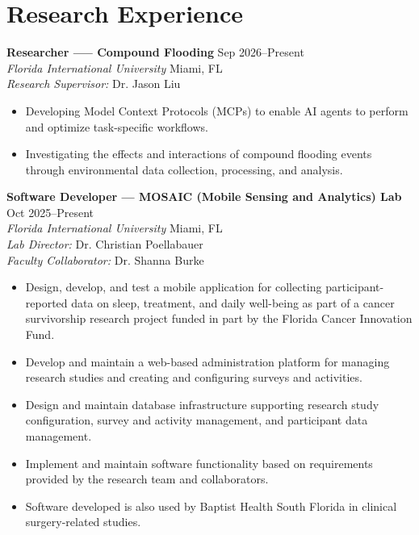 \documentclass[11pt]{article}
\begin{document}
\section{Research Experience}

\noindent
    \textbf{Researcher —-- Compound Flooding} \hfill Sep 2026--Present\\
    \textit{Florida International University} \hfill Miami, FL\\
    \textit{Research Supervisor:} Dr. Jason Liu
    \begin{itemize}
        \item Developing Model Context Protocols (MCPs) to enable AI agents to perform and optimize task-specific workflows.
        \item Investigating the effects and interactions of compound flooding events through environmental data collection, processing, and analysis.
    \end{itemize}

\vspace{0.4em}

\noindent
    \textbf{Software Developer --- MOSAIC (Mobile Sensing and Analytics) Lab} \hfill Oct 2025--Present\\
    \textit{Florida International University} \hfill Miami, FL\\
    \textit{Lab Director:} Dr. Christian Poellabauer\\
    \textit{Faculty Collaborator:} Dr. Shanna Burke
    \begin{itemize}
        \item Design, develop, and test a mobile application for collecting participant-reported data on sleep, treatment, and daily well-being as part of a cancer survivorship research project funded in part by the Florida Cancer Innovation Fund.
        \item Develop and maintain a web-based administration platform for managing research studies and creating and configuring surveys and activities.
        \item Design and maintain database infrastructure supporting research study configuration, survey and activity management, and participant data management.
        \item Implement and maintain software functionality based on requirements provided by the research team and collaborators.
        \item Software developed is also used by Baptist Health South Florida in clinical surgery-related studies.
    \end{itemize}
\end{document}
